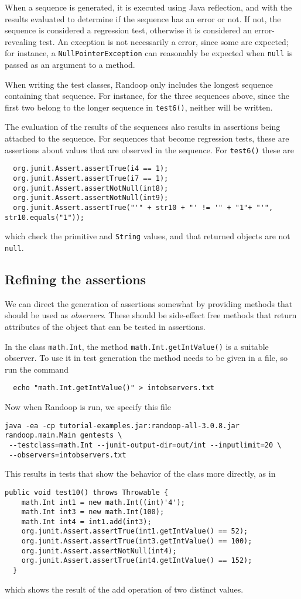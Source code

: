 \documentclass[11pt, oneside]{article} %
\newcommand{\code}[1]{{\texttt{#1}}}
\begin{document}
When a sequence is generated, it is executed using Java reflection, and with the results evaluated to determine if the sequence has an error or not. 
If not, the sequence is considered a regression test, otherwise it is considered an error-revealing test.
An exception is not necessarily a error, since some are expected; for instance, a \code{NullPointerException} can reasonably be expected when \code{null} is passed as an argument to a method. 

When writing the test classes, Randoop only includes the longest sequence containing that sequence.
For instance, for the three sequences above, since the first two belong to the longer sequence in \code{test6()}, neither will be written.

The evaluation of the results of the sequences also results in assertions being attached to the sequence. 
For sequences that become regression tests, these are assertions about values that are observed in the sequence.
For \code{test6()} these are
\begin{verbatim}
  org.junit.Assert.assertTrue(i4 == 1);
  org.junit.Assert.assertTrue(i7 == 1);
  org.junit.Assert.assertNotNull(int8);
  org.junit.Assert.assertNotNull(int9);
  org.junit.Assert.assertTrue("'" + str10 + "' != '" + "1"+ "'", str10.equals("1"));
\end{verbatim}
which check the primitive and \code{String} values, and that returned objects are not \code{null}.


\subsection{Refining the assertions}
We can direct the generation of assertions somewhat by providing methods that should be used as \emph{observers}.
These should be side-effect free methods that return attributes of the object that can be tested in assertions.

In the class \code{math.Int}, the method \code{math.Int.getIntValue()} is a suitable observer.
To use it in test generation the method needs to be given in a file, so run the command
\begin{verbatim}
  echo "math.Int.getIntValue()" > intobservers.txt
\end{verbatim}
Now when Randoop is run, we specify this file
\begin{verbatim}
java -ea -cp tutorial-examples.jar:randoop-all-3.0.8.jar randoop.main.Main gentests \
 --testclass=math.Int --junit-output-dir=out/int --inputlimit=20 \
 --observers=intobservers.txt
\end{verbatim}
This results in tests that show the behavior of the class more directly, as in
\begin{verbatim}
public void test10() throws Throwable {
    math.Int int1 = new math.Int((int)'4');
    math.Int int3 = new math.Int(100);
    math.Int int4 = int1.add(int3);
    org.junit.Assert.assertTrue(int1.getIntValue() == 52);
    org.junit.Assert.assertTrue(int3.getIntValue() == 100);
    org.junit.Assert.assertNotNull(int4);
    org.junit.Assert.assertTrue(int4.getIntValue() == 152);
  }
\end{verbatim}
which shows the result of the add operation of two distinct values.
\end{document}

